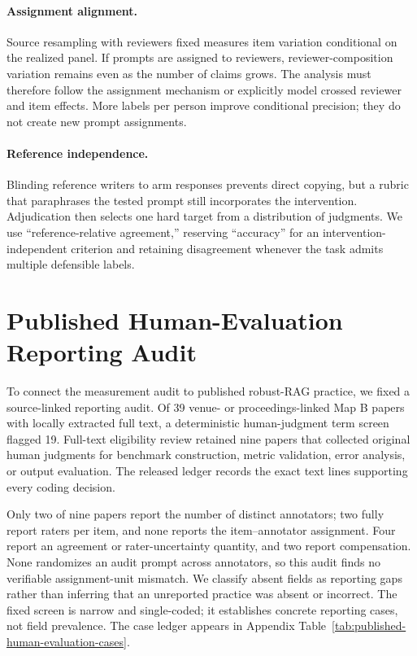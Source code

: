 \documentclass[11pt]{article}
\begin{document}
\paragraph{Assignment alignment.}
Source resampling with reviewers fixed measures item variation conditional on
the realized panel. If prompts are assigned to reviewers, reviewer-composition
variation remains even as the number of claims grows. The analysis must
therefore follow the assignment mechanism or explicitly model crossed
reviewer and item effects. More labels per person improve conditional
precision; they do not create new prompt assignments.

\paragraph{Reference independence.}
Blinding reference writers to arm responses prevents direct copying, but a
rubric that paraphrases the tested prompt still incorporates the intervention.
Adjudication then selects one hard target from a distribution of judgments.
We use ``reference-relative agreement,'' reserving ``accuracy'' for an
intervention-independent criterion and retaining disagreement whenever the
task admits multiple defensible labels.

\section{Published Human-Evaluation Reporting Audit}
\label{sec:published-audit}

To connect the measurement audit to published robust-RAG practice, we fixed a
source-linked reporting audit. Of 39 venue- or proceedings-linked Map B papers
with locally extracted full text, a deterministic human-judgment term screen
flagged 19. Full-text eligibility review retained nine papers that collected
original human judgments for benchmark construction, metric validation, error
analysis, or output evaluation. The released ledger records the exact text
lines supporting every coding decision.



Only two of nine papers report the number of distinct annotators; two fully
report raters per item, and none reports the item--annotator assignment.
Four report an agreement or rater-uncertainty quantity, and two report
compensation. None randomizes an audit prompt across annotators, so this audit
finds no verifiable assignment-unit mismatch. We classify absent fields as
reporting gaps rather than inferring that an unreported practice was absent or
incorrect. The fixed screen is narrow and single-coded; it establishes
concrete reporting cases, not field prevalence. The case ledger appears in
Appendix Table~\ref{tab:published-human-evaluation-cases}.
\end{document}
